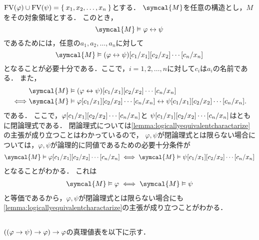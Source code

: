 \(\apply{\FV}{\varphi} \cup \apply{\FV}{\psi} = \Set{x_1, x_2, \dots, x_n}\)とする．
\(\symcal{M}\)を任意の構造とし，\(M\)をその対象領域とする．
このとき，
\[
	\symcal{M} \satisfy \varphi \formulaequiv \psi
\]
であるためには，任意の\(a_1,a_2, \dots, a_n\)に対して
\[
	\symcal{M} \satisfy \subst{\subst{\subst{\paren{\varphi \formulaequiv \psi}}{c_1/x_1}}{c_2/x_2} \dotsb}{c_n/x_n}
\]
となることが必要十分である．ここで，\(i = 1,2,\dots,n\)に対して\(c_i\)は\(a_i\)の名前である．
また，
\begin{align*}
	                & \symcal{M} \satisfy \subst{\subst{\subst{\paren{\varphi \formulaequiv \psi}}{c_1/x_1}}{c_2/x_2} \dotsb}{c_n/x_n}                                                    \\
	\metaequivalent & \symcal{M} \satisfy \subst{\subst{\subst{\varphi}{c_1/x_1}}{c_2/x_2} \dotsb}{c_n/x_n} \formulaequiv \subst{\subst{\subst{\psi}{c_1/x_1}}{c_2/x_2} \dotsb}{c_n/x_n}.
\end{align*}
である．
ここで，\(\subst{\subst{\subst{\varphi}{c_1/x_1}}{c_2/x_2} \dotsb}{c_n/x_n}\)と
\(\subst{\subst{\subst{\psi}{c_1/x_1}}{c_2/x_2} \dotsb}{c_n/x_n}\)はともに閉論理式である．
閉論理式については\cref{lemma:logicallyequivalentcharactarize}の主張が成り立つことはわかっているので，
\(\varphi, \psi\)が閉論理式とは限らない場合については，\(\varphi, \psi\)が論理的に同値であるための必要十分条件が
\begin{align*}
	\symcal{M} \satisfy \subst{\subst{\subst{\varphi}{c_1/x_1}}{c_2/x_2} \dotsb}{c_n/x_n} \metaequivalent \symcal{M} \satisfy \subst{\subst{\subst{\psi}{c_1/x_1}}{c_2/x_2} \dotsb}{c_n/x_n}
\end{align*}
となることがわかる．
これは
\begin{align*}
	\symcal{M} \satisfy \varphi \metaequivalent \symcal{M} \satisfy \psi
\end{align*}
と等価であるから，\(\varphi, \psi\)が閉論理式とは限らない場合にも\cref{lemma:logicallyequivalentcharactarize}の主張が成り立つことがわかる．

\subsection*{}

\(\paren{\paren{\varphi \to \psi} \to \varphi} \to \varphi\)の真理値表を以下に示す．

